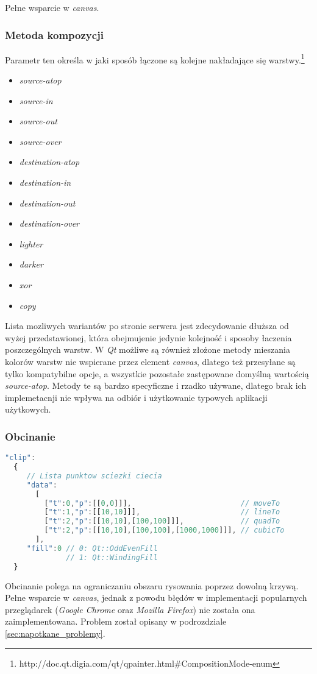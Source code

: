 Pełne wsparcie w \emph{canvas}. 

\subsubsection{Metoda kompozycji}
Parametr ten określa w jaki sposób łączone są kolejne nakładające się warstwy.\footnote{http://doc.qt.digia.com/qt/qpainter.html\#CompositionMode-enum}
\begin{itemize}
\item \emph{source-atop}
\item \emph{source-in}
\item \emph{source-out}
\item \emph{source-over}
\item \emph{destination-atop}
\item \emph{destination-in}
\item \emph{destination-out}
\item \emph{destination-over}
\item \emph{lighter}
\item \emph{darker}
\item \emph{xor}
\item \emph{copy}
\end{itemize}

Lista mozliwych wariantów po stronie serwera jest zdecydowanie dłuższa od wyżej przedstawionej, która obejmujenie jedynie kolejność i sposoby łaczenia poszczególnych warstw. W \emph{Qt} możliwe są również złożone metody mieszania kolorów warstw nie wspierane przez element \emph{canvas}, dlatego też przesyłane są tylko kompatybilne opcje, a wszystkie pozostałe zastępowane domyślną wartością \emph{source-atop}. Metody te są bardzo specyficzne i rzadko używane, dlatego brak ich implemetacnji nie wpływa na odbiór i użytkowanie typowych aplikacji użytkowych.

\subsubsection{Obcinanie}
\begin{lstlisting}[language=JavaScript,numbers=none]
"clip":
  {
     // Lista punktow sciezki ciecia
     "data":			
       [
         ["t":0,"p":[[0,0]]],                         // moveTo
         ["t":1,"p":[[10,10]]],                       // lineTo
         ["t":2,"p":[[10,10],[100,100]]],             // quadTo
         ["t":2,"p":[[10,10],[100,100],[1000,1000]]], // cubicTo
       ],
     "fill":0 // 0: Qt::OddEvenFill
              // 1: Qt::WindingFill
  }
\end{lstlisting}
Obcinanie polega na ograniczaniu obszaru rysowania poprzez dowolną krzywą. 
Pełne wsparcie w \emph{canvas}, jednak z powodu błędów w implementacji popularnych przeglądarek (\emph{Google Chrome} oraz \emph{Mozilla Firefox}) nie została ona zaimplementowana. Problem został opisany w podrozdziale \ref{sec:napotkane_problemy}.